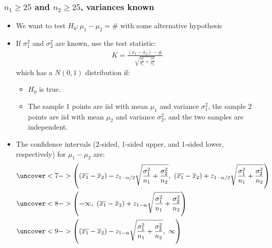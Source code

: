 \documentclass[handout]{beamer}\usepackage{graphicx, color}
\providecommand{\ov}[1]{\overline{#1}}
\numberwithin{equation}{section}
\begin{document}
\begin{frame}
\frametitle{$n_1 \ge 25$ and $n_2 \ge 25$, variances known} \scriptsize
\begin{itemize}
\item We want to test $H_0: \mu_1 - \mu_2 = \#$ with some alternative hypothesis
\pause \item If $\sigma^2_1$ and $\sigma_2^2$ are known, use the test statistic:
\pause \begin{align*}
K = \frac{(\ov{x}_1 - \ov{x}_2) - \#}{\sqrt{\frac{\sigma^2_1}{n_1} + \frac{\sigma^2_2}{n_2}}}
\end{align*}
which has a $N(0,1)$ distribution if:
\begin{itemize}
\pause \item $H_0$ is true.
\pause \item The sample 1 points are iid with mean $\mu_1$ and variance $\sigma^2_1$, the sample 2 points are iid with mean $\mu_2$ and variance $\sigma^2_2$, and the two samples are independent.
\end{itemize}
\pause \item The confidence intervals (2-sided, 1-sided upper, and 1-sided lower, respectively) for $\mu_1 - \mu_2$ are:
\begin{align*}
&\uncover<7->{\left ((\ov{x_1} - \ov{x}_2) - z_{1 - \alpha/2} \sqrt{\frac{\sigma^2_1}{n_1} + \frac{\sigma^2_2}{n_2}} , \ (\ov{x_1} - \ov{x}_2) + z_{1 - \alpha/2} \sqrt{\frac{\sigma^2_1}{n_1} + \frac{\sigma^2_2}{n_2}} \right )} \\
&\uncover<8->{\left (-\infty , \ (\ov{x_1} - \ov{x}_2) + z_{1 - \alpha} \sqrt{\frac{\sigma^2_1}{n_1} + \frac{\sigma^2_2}{n_2}} \right )} \\
&\uncover<9->{\left ((\ov{x_1} - \ov{x}_2) - z_{1 - \alpha} \sqrt{\frac{\sigma^2_1}{n_1} + \frac{\sigma^2_2}{n_2}}, \ \infty \right )} 
\end{align*}
\end{itemize}
\end{frame}
\end{document}
